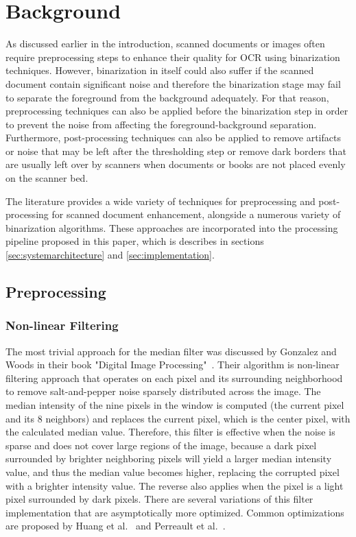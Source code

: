 \section{Background}

As discussed earlier in the introduction, scanned documents or images often require preprocessing steps to enhance their quality for OCR using binarization techniques. However, binarization in itself could also suffer if the scanned document contain significant noise and therefore the binarization stage may fail to separate the foreground from the background adequately. For that reason, preprocessing techniques can also be applied before the binarization step in order to prevent the noise from affecting the foreground-background separation. Furthermore, post-processing techniques can also be applied to remove artifacts or noise that may be left after the thresholding step or remove dark borders that are usually left over by scanners when documents or books are not placed evenly on the scanner bed. 

The literature provides a wide variety of techniques for preprocessing and post-processing for scanned document enhancement, alongside a numerous variety of binarization algorithms. These approaches are incorporated into the processing pipeline proposed in this paper, which is describes in sections \ref{sec:systemarchitecture} and \ref{sec:implementation}.

\subsection{Preprocessing}

\subsubsection{Non-linear Filtering}

The most trivial approach for the median filter was discussed by Gonzalez and Woods in their book "Digital Image Processing"~\cite{gonzalez2008digital}. Their algorithm is non-linear filtering approach that operates on each pixel and its surrounding neighborhood to remove salt-and-pepper noise sparsely distributed across the image. The median intensity of the nine pixels in the window is computed (the current pixel and its 8 neighbors) and replaces the current pixel, which is the center pixel, with the calculated median value. Therefore, this filter is effective when the noise is sparse and does not cover large regions of the image, because a dark pixel surrounded by brighter neighboring pixels will yield a larger median intensity value, and thus the median value becomes higher, replacing the corrupted pixel with a brighter intensity value. The reverse also applies when the pixel is a light pixel surrounded by dark pixels. There are several variations of this filter implementation that are asymptotically more optimized. Common optimizations are proposed by Huang et al.~\cite{1163188} and Perreault et al.~\cite{4287006}.

